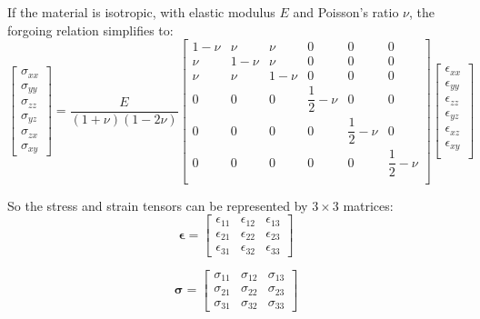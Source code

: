 \documentclass[10pt,a4paper]{article}
\begin{document}
If the material is isotropic, with elastic modulus $ E $ and Poisson's ratio $ \nu $, the forgoing relation simplifies to:
\begin{equation}
\begin{bmatrix}
\sigma_{xx} \\
\sigma_{yy} \\
\sigma_{zz} \\
\sigma_{yz} \\
\sigma_{zx} \\
\sigma_{xy}
\end{bmatrix} = \dfrac{E}{(1+\nu)(1-2\nu)} \begin{bmatrix}
1-\nu & \nu & \nu & 0 & 0 & 0 \\
\nu & 1-\nu & \nu & 0 & 0 & 0 \\
\nu & \nu & 1-\nu & 0 & 0 & 0 \\
0 & 0 & 0 & \dfrac{1}{2}-\nu & 0 & 0 \\
0 & 0 & 0 & 0 & \dfrac{1}{2}-\nu & 0 \\
0 & 0 & 0 & 0 & 0 & \dfrac{1}{2}-\nu \\
\end{bmatrix} \begin{bmatrix}
\epsilon_{xx} \\
\epsilon_{yy} \\
\epsilon_{zz} \\
\epsilon_{yz} \\
\epsilon_{xz} \\
\epsilon_{xy} \\
\end{bmatrix}
\end{equation}

So the stress and strain tensors can be represented by $ 3 \times 3 $ matrices:
\begin{equation}
\mathbf{\epsilon} = \begin{bmatrix}
\epsilon_{11} & \epsilon_{12} & \epsilon_{13} \\
\epsilon_{21} & \epsilon_{22} & \epsilon_{23} \\
\epsilon_{31} & \epsilon_{32} & \epsilon_{33}
\end{bmatrix}
\end{equation}

\begin{equation}
\mathbf{\sigma} = \begin{bmatrix}
\sigma_{11} & \sigma_{12} & \sigma_{13} \\
\sigma_{21} & \sigma_{22} & \sigma_{23} \\
\sigma_{31} & \sigma_{32} & \sigma_{33}
\end{bmatrix}
\end{equation}
\end{document}
